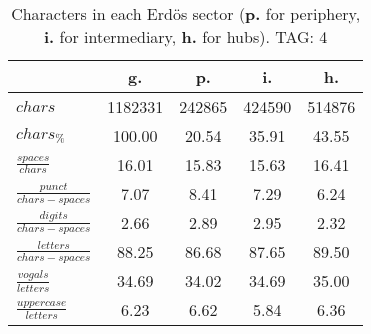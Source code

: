 \begin{table}[h!]
\begin{center}
\begin{tabular}{| l | c | c | c | c |}\hline
 & g. & p. & i. & h. \\\hline
$chars$ & 1182331  & 242865  & 424590  & 514876 \\\hline
$chars_{\%}$ & 100.00  & 20.54  & 35.91  & 43.55 \\\hline
$\frac{spaces}{chars}$ & 16.01  & 15.83  & 15.63  & 16.41 \\\hline
$\frac{punct}{chars-spaces}$ & 7.07  & 8.41  & 7.29  & 6.24 \\\hline
$\frac{digits}{chars-spaces}$ & 2.66  & 2.89  & 2.95  & 2.32 \\\hline
$\frac{letters}{chars-spaces}$ & 88.25  & 86.68  & 87.65  & 89.50 \\\hline
$\frac{vogals}{letters}$ & 34.69  & 34.02  & 34.69  & 35.00 \\\hline
$\frac{uppercase}{letters}$ & 6.23  & 6.62  & 5.84  & 6.36 \\\hline
\end{tabular}
\caption{Characters in each Erd\"os sector ({{\bf p.}} for periphery, {{\bf i.}} for intermediary, 
    {{\bf h.}} for hubs). TAG: 4}
\end{center}
\end{table}
